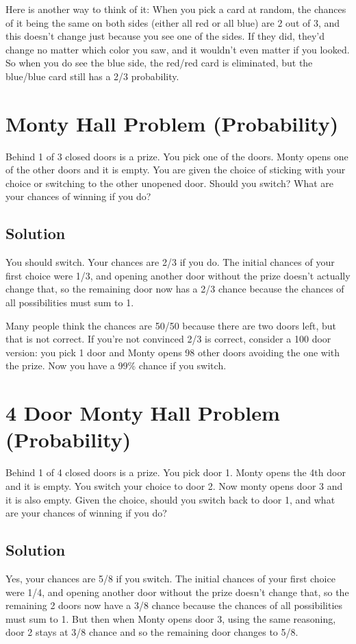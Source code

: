 \documentclass{article}
\begin{document}
Here is another way to think of it: When you pick a card at random, the chances of it being the same on both sides (either all red or all blue) are 2 out of 3, and this doesn't change just because you see one of the sides. If they did, they'd change no matter which color you saw, and it wouldn't even matter if you looked. So when you do see the blue side, the red/red card is eliminated, but the blue/blue card still has a 2/3 probability.

\section{Monty Hall Problem (Probability)}
Behind 1 of 3 closed doors is a prize. You pick one of the doors. Monty opens one of the other doors and it is empty. You are given the choice of sticking with your choice or switching to the other unopened door. Should you switch? What are your chances of winning if you do?

\subsection{Solution}
You should switch. Your chances are 2/3 if you do. The initial chances of your first choice were 1/3, and opening another door without the prize doesn't actually change that, so the remaining door now has a 2/3 chance because the chances of all possibilities must sum to 1.

Many people think the chances are 50/50 because there are two doors left, but that is not correct. If you're not convinced 2/3 is correct, consider a 100 door version: you pick 1 door and Monty opens 98 other doors avoiding the one with the prize. Now you have a 99\% chance if you switch.

\section{4 Door Monty Hall Problem (Probability)}
Behind 1 of 4 closed doors is a prize. You pick door 1. Monty opens the 4th door and it is empty. You switch your choice to door 2. Now monty opens door 3 and it is also empty. Given the choice, should you switch back to door 1, and what are your chances of winning if you do?

\subsection{Solution}
Yes, your chances are 5/8 if you switch. The initial chances of your first choice were 1/4, and opening another door without the prize doesn't change that, so the remaining 2 doors now have a 3/8 chance because the chances of all possibilities must sum to 1. But then when Monty opens door 3, using the same reasoning, door 2 stays at 3/8 chance and so the remaining door changes to 5/8.
\end{document}
